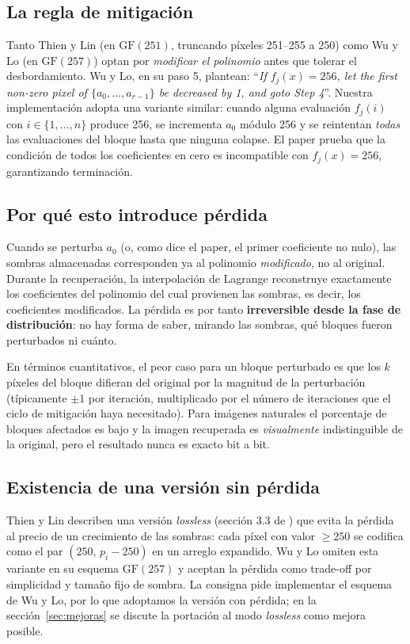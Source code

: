 \documentclass[11pt,a4paper]{article}
\begin{document}
\subsection*{La regla de mitigación}

Tanto Thien y Lin (en $\mathrm{GF}(251)$, truncando píxeles 251--255 a 250)
como Wu y Lo (en $\mathrm{GF}(257)$) optan por \emph{modificar el polinomio}
antes que tolerar el desbordamiento. Wu y Lo, en su paso 5, plantean:
``\emph{If $f_j(x)=256$, let the first non-zero pixel of $\{a_0,\dots,a_{r-1}\}$
be decreased by 1, and goto Step 4}''. Nuestra implementación adopta una
variante similar: cuando alguna evaluación $f_j(i)$ con
$i\in\{1,\dots,n\}$ produce 256, se incrementa $a_0$ módulo 256 y se
reintentan \emph{todas} las evaluaciones del bloque hasta que ninguna
colapse. El paper prueba que la condición de todos los coeficientes en
cero es incompatible con $f_j(x)=256$, garantizando terminación.

\subsection*{Por qué esto introduce pérdida}

Cuando se perturba $a_0$ (o, como dice el paper, el primer
coeficiente no nulo), las sombras almacenadas corresponden ya al
polinomio \emph{modificado}, no al original. Durante la recuperación,
la interpolación de Lagrange reconstruye exactamente los coeficientes
del polinomio del cual provienen las sombras, es decir, los
coeficientes modificados. La pérdida es por tanto \textbf{irreversible
desde la fase de distribución}: no hay forma de saber, mirando las
sombras, qué bloques fueron perturbados ni cuánto.

En términos cuantitativos, el peor caso para un bloque perturbado es que
los $k$ píxeles del bloque difieran del original por la magnitud de la
perturbación (típicamente $\pm 1$ por iteración, multiplicado por el
número de iteraciones que el ciclo de mitigación haya necesitado).
Para imágenes naturales el porcentaje de bloques afectados es bajo y
la imagen recuperada es \emph{visualmente} indistinguible de la
original, pero el resultado nunca es exacto bit a bit.

\subsection*{Existencia de una versión sin pérdida}

Thien y Lin \cite{thien2002} describen una versión \emph{lossless}
(sección 3.3 de \cite{thien2002}) que evita la pérdida al precio de un
crecimiento de las sombras: cada píxel con valor $\geq 250$ se codifica
como el par $(250,\,p_i-250)$ en un arreglo expandido. Wu y Lo omiten
esta variante en su esquema $\mathrm{GF}(257)$ y aceptan la pérdida como
trade-off por simplicidad y tamaño fijo de sombra. La consigna pide
implementar el esquema de Wu y Lo, por lo que adoptamos la versión con
pérdida; en la sección~\ref{sec:mejoras} se discute la portación al modo
\emph{lossless} como mejora posible.
\end{document}
